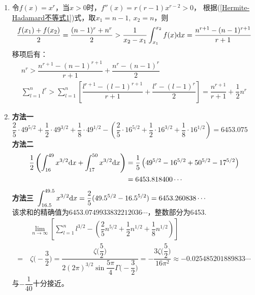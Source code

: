 \begin{enumerate}[label={\textbf{\thechapter.\arabic*}},leftmargin=
    \inteval{\myenumleftmargin}pt]
$ \e^{x_2}=u_2>0 $，则只需证$ pu_1+qu_2\geq u_1^pu_2^q $，这就是(4)的结果。\\
(6) 
\begin{gather*}
    \dfrac{1}{4}(x_1^2+2+2\sqrt{x_1^2+2}\sqrt{x_2^2+2}+x_2^2+2)\geq 
    \dfrac{1}{4}(x_1^2+2x_1x_2+x_2^2)+2 \q \Leftrightarrow \\
    \sqrt{x_1^2+2}\sqrt{x_2^2+2}\geq x_1x_2+2 \q \text{(两边平方即可证明)}
\end{gather*}
(7) 要证$ \dfrac{1}{2}(x_1\ln x_1+x_2\ln x_2)\geq \dfrac{x_1+x_2}{2}
\ln \dfrac{x_1+x_2}{2} $，可以固定$ x_1 $，以$ x_2 $为变量，
然后对$ x_2 $求导，过程略。\\
(8)把(7)中的$ x_i $换成$ \e^{x_i} $即得。\\
请读者分别计算以上各个函数的二阶导数，并判断其正负号，再结合函数图像
体会二阶导数的正负与凹凸性的关系。

\item 
令$ f(x)=x^r $，当$ x>0 $时，$ f''(x)=r(r-1)x^{r-2}>0 $，
根据(\ref{Hermite-Hadamard不等式1})式，取$ x_1=n-1,\ x_2=n $，则
\begin{gather*}
    \dfrac{f(x_1)+f(x_2)}{2}=\dfrac{(n-1)^r+n^r}{2}>
    \dfrac{1}{x_2-x_1}\int_{x_1}^{x_2}f(x)\mathrm{d} x=\dfrac{n^{r+1}-(n-1)^{r+1}}{r+1}
\end{gather*}
移项后有：
\begin{gather*}
    n^r > \dfrac{n^{r+1}-(n-1)^{r+1}}{r+1}+\dfrac{n^{r}-(n-1)^{r}}{2} \\
    \sum\limits_{l=1}^n l^r>\sum_{l=1}^n
    \left[\dfrac{l^{r+1}-(l-1)^{r+1}}{r+1}+\dfrac{l^{r}-(l-1)^{r}}{2}\right]=
    \dfrac{n^{r+1}}{r+1}+\dfrac{1}{2}n^r
\end{gather*}

\item 
\textbf{方法一}\ 
$ \dfrac{2}{5}\cdot 49^{5/2}+\dfrac{1}{2}\cdot 49^{3/2}+\dfrac{1}{8}
\cdot 49^{1/2}-\left(
\dfrac{2}{5}\cdot 16^{5/2}+\dfrac{1}{2}\cdot 16^{3/2}+\dfrac{1}{8}\cdot 16^{1/2}\right)=6453.075 $  \\
\textbf{方法二}\ 
\begin{align*}
    \dfrac{1}{2}\left(\int_{16}^{49}x^{3/2}\mathrm{d} x+\int_{17}^{50}x^{3/2}
    \mathrm{d} x \right) &= \dfrac{1}{5}\left( 49^{5/2} -16^{5/2}+50^{5/2}-17^{5/2} 
    \right)\\ &= 6453.818400 \cdots
\end{align*}
\textbf{方法三}\ $ \displaystyle \int_{16.5}^{49.5}x^{3/2}\mathrm{d} x=
\dfrac{2}{5}(49.5^{5/2}-16.5^{5/2})=6453.260838 \cdots $ \\
该求和的精确值为$ 6453.0749933832212036\cdots $，整数部分为6453. 
\begin{align*}
    &\ \lim\limits_{n\to \infty} \left[ \sum\limits_{l=1}^{n} l^{3/2}-
    \left(\dfrac{2}{5}n^{5/2}+\dfrac{1}{2}n^{1/2}+\dfrac{1}{8}n^{1/2}
    \right)\right]\\ 
    =&\ \zeta\Big(-\dfrac{3}{2}\Big)=\dfrac{\zeta\Big(\dfrac{5}{2}\Big)}
    {2(2\pi)^{3/2}\sin\dfrac{5\pi}{4}\Gamma\Big(-\dfrac{3}{2}\Big)}
    =-\dfrac{3\zeta\Big(\dfrac{5}{2}\Big)}{16\pi^2} \approx -0.025485201889833\cdots
\end{align*}
与$ -\dfrac{1}{40} $十分接近。


\end{enumerate}
